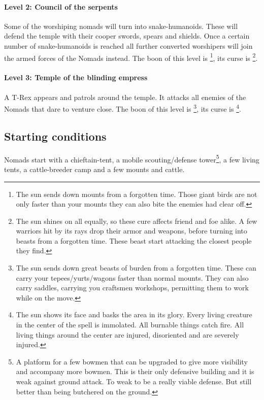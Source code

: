 \paragraph{Level 2: Council of the serpents}
Some of the worshiping nomads will turn into snake-humanoids. These will defend
the temple with their cooper swords, spears and shields. Once a certain number
of snake-humanoids is reached all further converted worshipers will join the
armed forces of the \gls{Nomads} instead. The boon of this level is
\footnote{ The sun sends down mounts from a
	forgotten time. Those giant birds are not only faster than your mounts they can
	also bite the enemies had clear off. }, its curse is \footnote{ The sun shines on all equally, so these cure affects friend
	and foe alike. A few warriors hit by its rays drop their armor and weapons,
	before turning into beasts from a forgotten time. These beast start attacking
	the closest people they find. }.

\paragraph{Level 3: Temple of the blinding empress}
A T-Rex appears and patrols around the temple. It attacks all enemies of the
\gls{Nomads} that dare to venture close. The boon of this level is
\footnote{ The sun sends down great beasts of
	burden from a forgotten time. These can carry your tepees/yurts/wagons faster
	than normal mounts. They can also carry saddles, carrying you craftsmen
	workshops, permitting them to work while on the move. }, its curse is
\footnote{ The sun shows its face and basks the area
	in its glory. Every living creature in the center of the spell is immolated.
	All burnable things catch fire. All living things around the center are
	injured, disoriented and are severely injured. }.

\subsection{Starting conditions}
\Gls{Nomads} start with a chieftain-tent, a mobile scouting/defense tower\footnote{
	A platform for a few bowmen that can be upgraded to give more visibility
	and accompany more bowmen.
	This is their only defensive building and it is weak against ground attack.
	To weak to be a really viable defense.
	But still better than being butchered on the ground.
}, a few living tents, a cattle-breeder camp and a few mounts and cattle.

